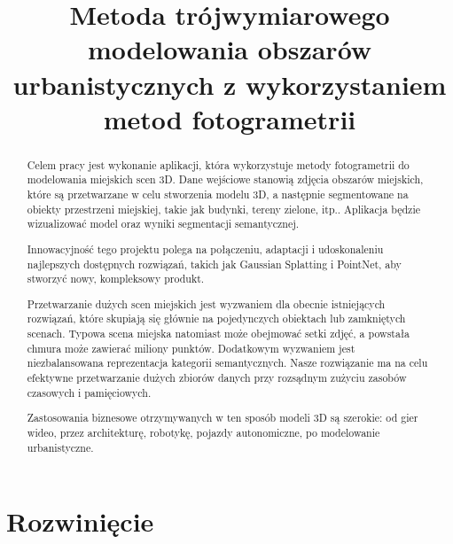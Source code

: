 \documentclass[polish,edition=2024]{zpiday}
\title{Metoda trójwymiarowego modelowania obszarów urbanistycznych z wykorzystaniem metod fotogrametrii}
\begin{document}
\maketitle

\begin{abstract}
    Celem pracy jest wykonanie aplikacji, która wykorzystuje metody fotogrametrii do modelowania miejskich scen 3D. Dane wejściowe stanowią zdjęcia obszarów miejskich, które są przetwarzane w celu stworzenia modelu 3D, a następnie segmentowane na obiekty przestrzeni miejskiej, takie jak budynki, tereny zielone, itp.. Aplikacja będzie wizualizować model oraz wyniki segmentacji semantycznej.

    Innowacyjność tego projektu polega na połączeniu, adaptacji i udoskonaleniu najlepszych dostępnych rozwiązań, takich jak Gaussian Splatting i PointNet, aby stworzyć nowy, kompleksowy produkt.

    Przetwarzanie dużych scen miejskich jest wyzwaniem dla obecnie istniejących rozwiązań, które skupiają się głównie na pojedynczych obiektach lub zamkniętych scenach. Typowa scena miejska natomiast może obejmować setki zdjęć, a powstała chmura może zawierać miliony punktów. Dodatkowym wyzwaniem jest niezbalansowana reprezentacja kategorii semantycznych. Nasze rozwiązanie ma na celu efektywne przetwarzanie dużych zbiorów danych przy rozsądnym zużyciu zasobów czasowych i pamięciowych.

    Zastosowania biznesowe otrzymywanych w ten sposób modeli 3D są szerokie: od gier wideo, przez architekturę, robotykę, pojazdy autonomiczne, po modelowanie urbanistyczne.
\end{abstract}

\section{Rozwinięcie}









% 
% 
\end{document}
